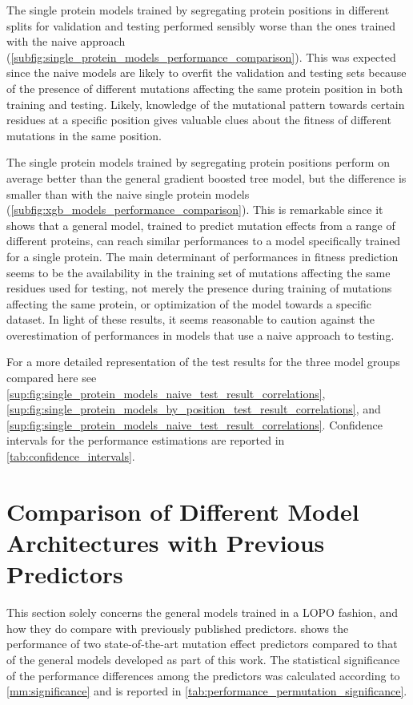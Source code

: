 The single protein models trained by segregating protein positions in different splits for validation and testing performed sensibly worse than the ones trained with the naive approach (\cref{subfig:single_protein_models_performance_comparison}).
This was expected since the naive models are likely to overfit the validation and testing sets because of the presence of different mutations affecting the same protein position in both training and testing.
Likely, knowledge of the mutational pattern towards certain residues at a specific position gives valuable clues about the fitness of different mutations in the same position.

The single protein models trained by segregating protein positions perform on average better than the general gradient boosted tree model, but the difference is smaller than with the naive single protein models (\cref{subfig:xgb_models_performance_comparison}).
This is remarkable since it shows that a general model, trained to predict mutation effects from a range of different proteins, can reach similar performances to a model specifically trained for a single protein.
The main determinant of performances in fitness prediction seems to be the availability in the training set of mutations affecting the same residues used for testing, not merely the presence during training of mutations affecting the same protein, or optimization of the model towards a specific dataset.
In light of these results, it seems reasonable to caution against the overestimation of performances in models that use a naive approach to testing.

For a more detailed representation of the test results for the three model groups compared here see \cref{sup:fig:single_protein_models_naive_test_result_correlations}, \cref{sup:fig:single_protein_models_by_position_test_result_correlations}, and \cref{sup:fig:single_protein_models_naive_test_result_correlations}.
Confidence intervals for the performance estimations are reported in \cref{tab:confidence_intervals}.

\section{Comparison of Different Model Architectures with Previous Predictors}
This section solely concerns the general models trained in a LOPO fashion, and how they do compare with previously published predictors.
 shows the performance of two state-of-the-art mutation effect predictors compared to that of the general models developed as part of this work.
The statistical significance of the performance differences among the predictors was calculated according to \cref{mm:significance} and is reported in \cref{tab:performance_permutation_significance}.

